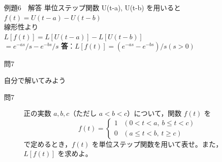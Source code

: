 \documentclass[professionalfonts]{beamer}
\begin{document}
\begin{frame}{例題6　解答}
  単位ステップ関数 U(t-a), U(t-b) を用いると\\[4pt]
  $f(t) = U(t-a) - U(t-b)$\\[4pt]
  線形性より\\[4pt]
  $L[f(t)] = L[U(t-a)] - L[U(t-b)]$\\[4pt]
  $= e^{-as}/s - e^{-bs}/s$
  \medskip\textbf{答}：$L[f(t)] = (e^{-as} - e^{-bs})/s  (s > 0)$
\end{frame}

\begin{frame}{問7}
  \begin{exampleblock}{自分で解いてみよう}
  \begin{description}
    \item[問7] 正の実数 $a, b, c$（ただし $a < b < c$）について，関数 $f(t)$ を
    \[
    f(t) = \begin{cases} 1 & (0 < t < a,\ b \leq t < c) \\ 0 & (a \leq t < b,\ t \geq c) \end{cases}
    \]
    で定めるとき，$f(t)$ を単位ステップ関数を用いて表せ。また，$L[f(t)]$ を求めよ。\\
  \end{description}
  \end{exampleblock}
\end{frame}
\end{document}
